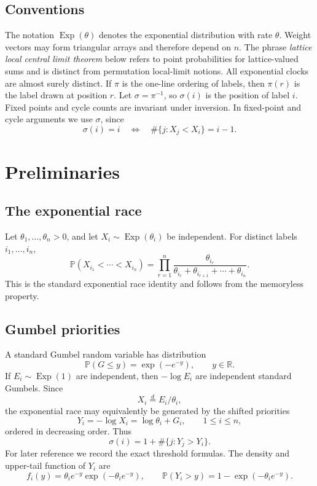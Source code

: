 \documentclass[11pt]{article}
\theoremstyle{remark}
\newcommand{\Pp}{\mathbb P}
\newcommand{\Rr}{\mathbb R}
\newcommand{\Exp}{\operatorname{Exp}}
\begin{document}
\subsection*{Conventions}
The notation $\Exp(\theta)$ denotes the exponential distribution with rate
$\theta$.  Weight vectors may form triangular arrays and therefore depend on
$n$.  The phrase \emph{lattice local central limit theorem} below refers to
point probabilities for lattice-valued sums and is distinct from permutation
local-limit notions.  All exponential clocks are almost surely distinct.  If \(\pi\) is the
one-line ordering of labels, then \(\pi(r)\) is the label drawn at position
\(r\).  Let \(\sigma=\pi^{-1}\), so \(\sigma(i)\) is the position of label
\(i\).  Fixed points and cycle counts are invariant under inversion.  In
fixed-point and cycle arguments we use \(\sigma\), since
\[
        \sigma(i)=i \quad\Longleftrightarrow\quad
        \#\{j:X_j<X_i\}=i-1.
\]

\section{Preliminaries}

\subsection{The exponential race}
Let \(\theta_1,\ldots,\theta_n>0\), and let \(X_i\sim\Exp(\theta_i)\) be independent.  For distinct labels \(i_1,\ldots,i_n\),
\[
\Pp(X_{i_1}<\cdots<X_{i_n})
= \prod_{r=1}^n
 \frac{\theta_{i_r}}{\theta_{i_r}+\theta_{i_{r+1}}+\cdots+\theta_{i_n}}.
\]
This is the standard exponential race identity and follows from the memoryless property.


\subsection{Gumbel priorities}\label{subsec:gumbel-priorities}
A standard Gumbel random variable has distribution
\[
        \Pp(G\le y)=\exp(-e^{-y}),
        \qquad y\in\Rr .
\]
If \(E_i\sim\Exp(1)\) are independent, then \(-\log E_i\) are independent standard Gumbels.  Since
\[
        X_i\stackrel{d}=E_i/\theta_i,
\]
the exponential race may equivalently be generated by the shifted priorities
\[
        Y_i=-\log X_i=\log\theta_i+G_i,
        \qquad 1\le i\le n,
\]
ordered in decreasing order.  Thus
\[
        \sigma(i)=1+\#\{j:Y_j>Y_i\}.
\]
For later reference we record the exact threshold formulas.  The density and upper-tail function of \(Y_i\) are
\[
        f_i(y)=\theta_i e^{-y}\exp(-\theta_i e^{-y}),
        \qquad
        \Pp(Y_i>y)=1-\exp(-\theta_i e^{-y}).
\]
\end{document}
